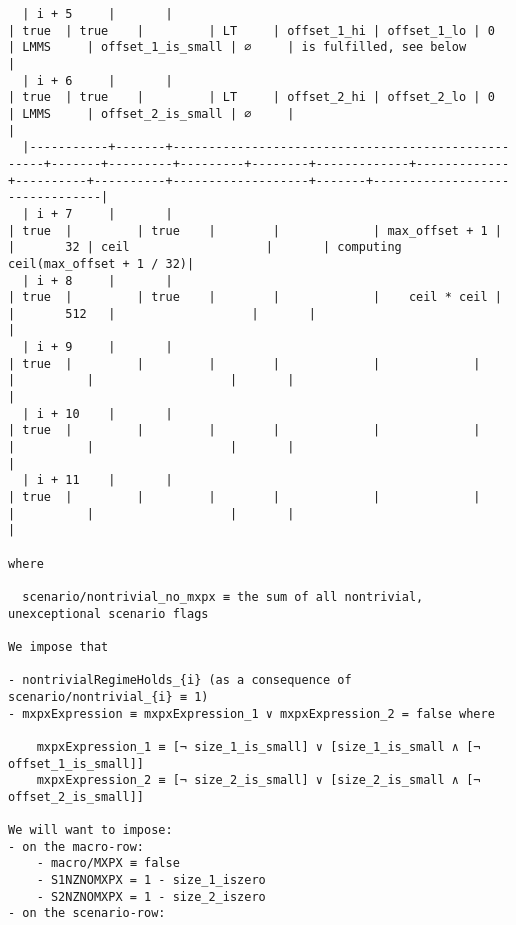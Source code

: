 \documentclass[varwidth=\maxdimen,margin=0.5cm,multi={verbatim}]{standalone}
\begin{document}
\begin{verbatim}
  | i + 5     |       |                                                    | true  | true    |         | LT     | offset_1_hi | offset_1_lo | 0        | LMMS     | offset_1_is_small | ∅     | is fulfilled, see below        |
  | i + 6     |       |                                                    | true  | true    |         | LT     | offset_2_hi | offset_2_lo | 0        | LMMS     | offset_2_is_small | ∅     |                                |
  |-----------+-------+----------------------------------------------------+-------+---------+---------+--------+-------------+-------------+----------+----------+-------------------+-------+--------------------------------|
  | i + 7     |       |                                                    | true  |         | true    |        |             | max_offset + 1 |          |       32 | ceil                   |       | computing ceil(max_offset + 1 / 32)|
  | i + 8     |       |                                                    | true  |         | true    |        |             |    ceil * ceil |          |       512   |                   |       |                                |
  | i + 9     |       |                                                    | true  |         |         |        |             |             |          |          |                   |       |                                |
  | i + 10    |       |                                                    | true  |         |         |        |             |             |          |          |                   |       |                                |
  | i + 11    |       |                                                    | true  |         |         |        |             |             |          |          |                   |       |                                |
     
where 

  scenario/nontrivial_no_mxpx ≡ the sum of all nontrivial, unexceptional scenario flags

We impose that

- nontrivialRegimeHolds_{i} (as a consequence of scenario/nontrivial_{i} ≡ 1)
- mxpxExpression ≡ mxpxExpression_1 ∨ mxpxExpression_2 = false where

	mxpxExpression_1 ≡ [¬ size_1_is_small] ∨ [size_1_is_small ∧ [¬ offset_1_is_small]]
	mxpxExpression_2 ≡ [¬ size_2_is_small] ∨ [size_2_is_small ∧ [¬ offset_2_is_small]]

We will want to impose:
- on the macro-row:
	- macro/MXPX ≡ false
	- S1NZNOMXPX = 1 - size_1_iszero
	- S2NZNOMXPX = 1 - size_2_iszero
- on the scenario-row:

\end{verbatim}
\end{document}
